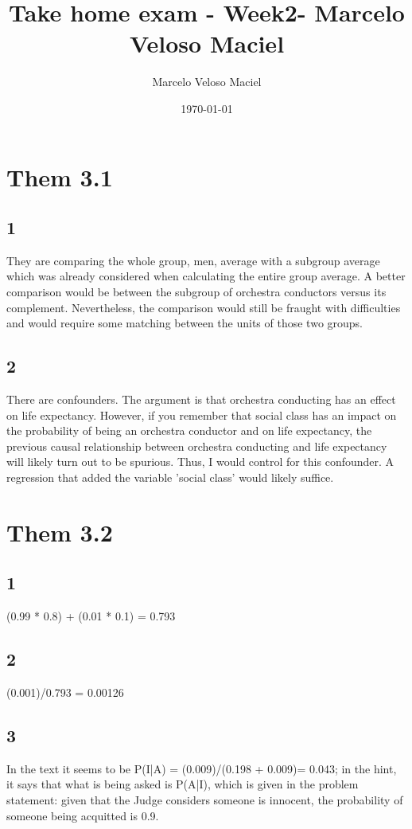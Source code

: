 \documentclass[11pt]{article}
\author{Marcelo Veloso Maciel}
\date{\today}
\title{Take home exam - Week2-  Marcelo Veloso Maciel}
\begin{document}
\maketitle




\section*{Them 3.1}
\label{sec:orgfc61e77}
\subsection*{1}
\label{sec:org66a858a}
They are comparing the whole group, men, average with a subgroup average which was already considered when calculating the entire group average. A better comparison would be between the subgroup of orchestra conductors versus its complement.  Nevertheless, the comparison would still be fraught with difficulties and would require some matching between the units of those two groups.
\subsection*{2}
\label{sec:org943f453}
There are confounders. The argument is that orchestra conducting has an effect on life expectancy. However, if you remember that social class has an impact on the probability of being an orchestra conductor and on life expectancy, the previous causal relationship between orchestra conducting and life expectancy will likely turn out to be spurious. Thus, I would control for this confounder. A regression that added the variable 'social class' would likely suffice.

\section*{Them 3.2}
\label{sec:orgcab4d74}
\subsection*{1}
\label{sec:org01734cc}
(0.99 * 0.8) + (0.01 * 0.1) = 0.793
\subsection*{2}
\label{sec:orgad4178e}
(0.001)/0.793 = 0.00126
\subsection*{3}
\label{sec:org0544646}
In the text it seems to be P(I|A) =
(0.009)/(0.198 + 0.009)= 0.043; in the hint, it says that what is being asked is P(A|I), which is given in the problem statement: given that the Judge considers someone is innocent, the probability of someone being acquitted is 0.9.
\end{document}

